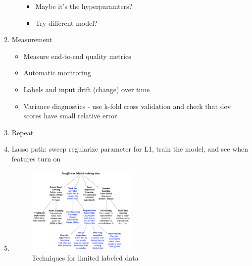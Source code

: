 \documentclass[../main.tex]{subfiles}
\begin{document}
\begin{enumerate}
\begin{itemize}
\begin{itemize}
      \item Maybe it's the hyperparamters?
      \item Try different model?
    \end{itemize}
  \end{itemize}
  \item Measurement
  \begin{itemize}
    \item Measure end-to-end quality metrics
    \item Automatic monitoring
    \item Labels and input drift (change) over time
    \item Variance diagnostics - use k-fold cross validation and check that dev scores have small relative error
  \end{itemize}
  \item Repeat

  \item Lasso path: sweep regularize parameter for L1, train the model, and see when features turn on
  \item
  \begin{figure}[h]
    \caption{Techniques for limited labeled data}
    \centering
    \includegraphics[width=0.5\textwidth]{../imgs/ml.png}
  \end{figure}
\end{enumerate}
\end{document}
